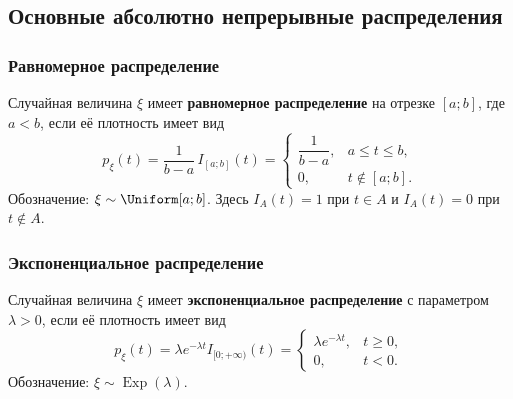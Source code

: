 \begingroup
{}
\subsection{Основные абсолютно непрерывные распределения}

\subsubsection{Равномерное распределение}

\begin{definition}
    Случайная величина $\xi$ имеет \textbf{равномерное распределение}
    на отрезке $[a;b]$, где $a<b$, если её плотность имеет вид
    \[
        p_\xi(t)=\frac{1}{b-a}\,I_{[a;b]}(t)
        =\begin{cases}
            \dfrac{1}{b-a},&a\leq t\leq b,\\
            0,&t\notin[a;b].
        \end{cases}
    \]
    Обозначение: $\xi\sim\Uniform[a;b]$.
    Здесь $I_A(t)=1$ при $t\in A$ и $I_A(t)=0$ при $t\notin A$.
\end{definition}

\begin{center}
\end{center}

\newpage
\subsubsection{Экспоненциальное распределение}

\begin{definition}
    Случайная величина $\xi$ имеет \textbf{экспоненциальное распределение}
    с параметром $\lambda>0$, если её плотность имеет вид
    \[
        p_\xi(t)=\lambda e^{-\lambda t}I_{[0;+\infty)}(t)
        =\begin{cases}
            \lambda e^{-\lambda t},&t\geq0,\\
            0,&t<0.
        \end{cases}
    \]
    Обозначение: $\xi\sim\operatorname{Exp}(\lambda)$.
\end{definition}

